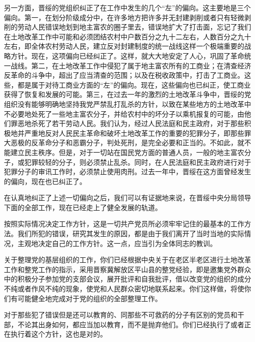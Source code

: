 另一方面，晋绥的党组织纠正了在工作中发生的几个“左”的偏向。这主要地是三个偏向。第一，在划分阶级成分中，在许多地方把许多并无封建剥削或者只有轻微剥削的劳动人民错误地划到地主富农的圈子里去，错误地扩大了打击面，忘记了我们在土地改革工作中可能和必须团结农村中户数百分之九十二左右，人数百分之九十左右，即全体农村劳动人民，建立反对封建制度的统一战线这样一个极端重要的战略方针。现在，这项偏向已经纠正了。这样，就大大地安定了人心，巩固了革命统一战线。第二，在土地改革工作中侵犯了属于地主富农所有的工商业；在清查经济反革命的斗争中，超出了应当清查的范围；以及在税收政策中，打击了工商业。这些，都是属于对待工商业方面的“左”的偏向。现在，这些偏向也已纠正，使工商业获得了恢复和发展的可能。第三，在过去一年的激烈的土地改革斗争中，晋绥的党组织没有能够明确地坚持我党严禁乱打乱杀的方针，以致在某些地方的土地改革中不必要地处死了一些地主富农分子，并给农村中的坏分子以乘机报复的可能，由他们罪恶地杀死了若干劳动人民。我们认为，经过人民法庭和民主政府，对于那些积极地并严重地反对人民民主革命和破坏土地改革工作的重要的犯罪分子，即那些罪大恶极的反革命分子和恶霸分子，判处死刑，是完全必要和正当的。不如此，就不能建立民主秩序。但是，对于一切站在国民党方面的普通人员，一般的地主富农分子，或犯罪较轻的分子，则必须禁止乱杀。同时，在人民法庭和民主政府进行对于犯罪分子的审讯工作时，必须禁止使用肉刑。过去一年中，晋绥在这方面曾经发生的偏向，现在也已纠正了。

在认真地纠正了上述一切偏向之后，我们可以有证据地来说，在晋绥中央分局领导下面的全部工作，现在已经走上了健全发展的轨道。

按照实际情况决定工作方针，这是一切共产党员所必须牢牢记住的最基本的工作方法。我们所犯的错误，研究其发生的原因，都是由于我们离开了当时当地的实际情况，主观地决定自己的工作方针。这一点，应当引为全体同志的教训。

关于整理党的基层组织的工作，你们已经根据中央关于在老区半老区进行土地改革工作和整党工作的指示，采用晋察冀解放区平山县的整党经验，即是邀集党外群众中的积极分子参加党的支部会议，展开批评和自我批评，借以改变党的组织的成分不纯或者作风不纯的现象，使党和人民群众密切地联系起来。你们这样做，将使你们有可能健全地完成对于党的组织的全部整理工作。

对于那些犯了错误但是还可以教育的、同那些不可救药的分子有区别的党员和干部，不论其出身如何，都应当加以教育，而不是抛弃他们。你们已经执行了或者正在执行着这个方针，这也是对的。

